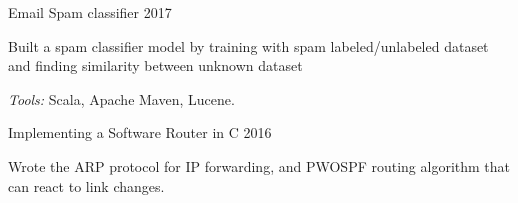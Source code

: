 \begin{cventries}
  \cventry
    {}
    {Email Spam classifier} %
    {2017} %
    {}
    {
      \vspace{-3mm}
      \begin{cvitems} %
        \item {Built a spam classifier model by training with spam labeled/unlabeled dataset and finding similarity between unknown dataset}
        \item {\textit{Tools:} Scala, Apache Maven, Lucene.}
      \end{cvitems}
    }
    {}

  \cventry
    {}
    {Implementing a Software Router in C} %
    {2016} %
    {}
    {
      \vspace{-3mm}
      \begin{cvitems} %
        \item {Wrote the ARP protocol for IP forwarding, and PWOSPF routing algorithm that can react to link changes.}
      \end{cvitems}
    }
    {}




\end{cventries}

